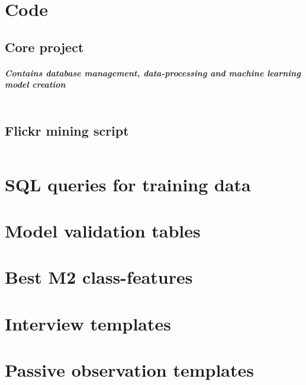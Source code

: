 \appendix

\chapter{Code} \label{python_code}

\section{Core project}
\paragraph*{Contains database management, data-processing and machine learning model creation}
\inputminted[linenos, fontsize=\tiny]{python}{code/fusion_file_appendix.py}
\clearpage

\section{Flickr mining script}
\inputminted[linenos, fontsize=\tiny]{python}{code/flickr_mining_Kt_Zug_Appendix.py}
\clearpage


\chapter{SQL queries for training data} \label{sql_queries_for_trainingdata}


\chapter{Model validation tables} \label{model_validation_tables}

\chapter{Best M2 class-features} \label{M2_top_features}

\chapter{Interview templates} \label{interview_templates}

\chapter{Passive observation templates} \label{passive_obs_templates}

